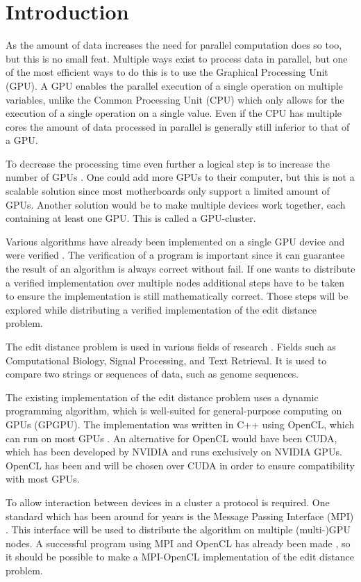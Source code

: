\section{Introduction}
As the amount of data increases the need for parallel computation does so too, but this is no small feat.
Multiple ways exist to process data in parallel, but one of the most efficient ways to do this is to use the Graphical Processing Unit (GPU).
A GPU enables the parallel execution of a single operation on multiple variables, unlike the Common Processing Unit (CPU) which only allows for the execution of a single operation on a single value.
Even if the CPU has multiple cores the amount of data processed in parallel is generally still inferior to that of a GPU.

To decrease the processing time even further a logical step is to increase the number of GPUs \cite{Cluster}.
One could add more GPUs to their computer, but this is not a scalable solution since most motherboards only support a limited amount of GPUs.
Another solution would be to make multiple devices work together, each containing at least one GPU.
This is called a GPU-cluster.

Various algorithms have already been implemented on a single GPU device and were verified \cite{Heus}.
The verification of a program is important since it can guarantee the result of an algorithm is always correct without fail.
If one wants to distribute a verified implementation over multiple nodes additional steps have to be taken to ensure the implementation is still mathematically correct.
Those steps will be explored while distributing a verified implementation of the edit distance problem.

The edit distance problem is used in various fields of research \cite{Navarro:2001:GTA:375360.375365}.
Fields such as Computational Biology, Signal Processing, and Text Retrieval.
It is used to compare two strings or sequences of data, such as genome sequences.

The existing implementation of the edit distance problem uses a dynamic programming algorithm, which is well-suited for general-purpose computing on GPUs (GPGPU).
The implementation was written in C++ using OpenCL, which can run on most GPUs \cite{Kronos:conformant}.
An alternative for OpenCL would have been CUDA, which has been developed by NVIDIA and runs exclusively on NVIDIA GPUs.
OpenCL has been and will be chosen over CUDA in order to ensure compatibility with most GPUs.

To allow interaction between devices in a cluster a protocol is required.
One standard which has been around for years is the Message Passing Interface (MPI) \cite{MPI}.
This interface will be used to distribute the algorithm on multiple (multi-)GPU nodes.
A successful program using MPI and OpenCL has already been made \cite{Cluster}, so it should be possible to make a MPI-OpenCL implementation of the edit distance problem.

